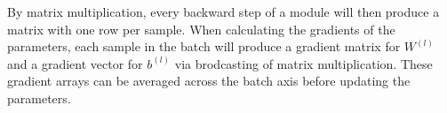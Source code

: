 \documentclass{article}
\begin{document}
By matrix multiplication, every backward step of a module will then produce a matrix with one row per sample. When calculating the gradients of the parameters, each sample in the batch will produce a gradient matrix for $W^{(l)}$ and a gradient vector for $b^{(l)}$ via brodcasting of matrix multiplication. These gradient arrays can be averaged across the batch axis before updating the parameters.
\end{document}

